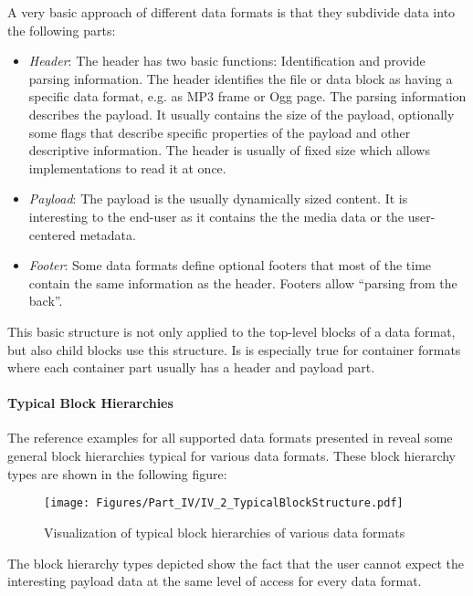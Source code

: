 A very basic approach of different data formats is that they subdivide data into the following parts:
\begin{itemize}
	\item \emph{Header}: The header has two basic functions: Identification and provide parsing information. The header identifies the file or data block as having a specific data format, e.g. as MP3 frame or Ogg page. The parsing information describes the payload. It usually contains the size of the payload, optionally some flags that describe specific properties of the payload and other descriptive information. The header is usually of fixed size which allows implementations to read it at once.
	\item \emph{Payload}: The payload is the usually dynamically sized content. It is interesting to the end-user as it contains the the media data or the user-centered metadata.
	\item \emph{Footer}: Some data formats define optional footers that most of the time contain the same information as the header. Footers allow ``parsing from the back''.
\end{itemize}

This basic structure is not only applied to the top-level blocks of a data format, but also child blocks use this structure. Is is especially true for container formats where each container part usually has a header and payload part.


\paragraph{Typical Block Hierarchies}
\label{sec:TypicalBlockHierarchies}

The reference examples for all supported data formats presented in  reveal some general block hierarchies typical for various data formats. These block hierarchy types are shown in the following figure:

\begin{figure}[H]
	\centering
	\texttt{[image: Figures/Part\_IV/IV\_2\_TypicalBlockStructure.pdf]}
	\caption{Visualization of typical block hierarchies of various data formats}
	\label{fig:IV_2_TypicalBlockStructure}
\end{figure}

The block hierarchy types depicted show the fact that the user cannot expect the interesting payload data at the same level of access for every data format.

